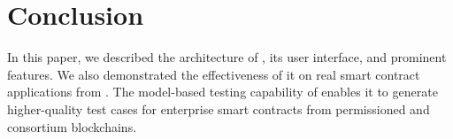 \section{Conclusion}
\label{sec:conclude}

In this paper, we described the architecture of \modcon, its user interface, and prominent features.
We also demonstrated the effectiveness of it on real smart contract applications from \company.
The model-based testing capability of \modcon enables it to generate higher-quality test cases for
enterprise smart contracts from permissioned and consortium blockchains.
